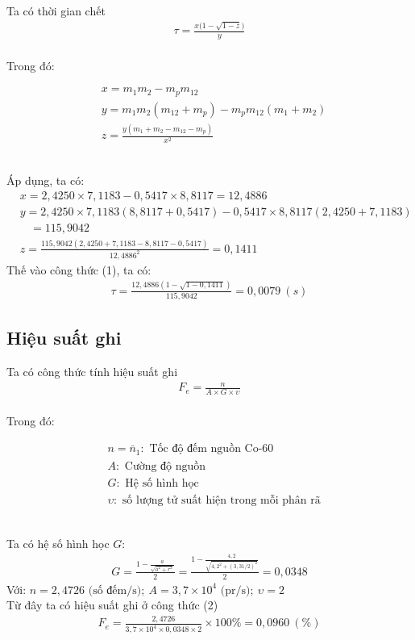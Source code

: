 \documentclass{article}
\begin{document}
Ta có thời gian chết
\begin{align}
	\tau = \frac{x\Big(1- \sqrt{1-z}\Big)}{y}
\end{align}
\\
Trong đó:
\begin{fleqn}[\parindent]
\begin{equation*}
\begin{split}
& x = m_1m_2-m_pm_{12}  \\
& y = m_1m_2(m_{12}+m_p)-m_pm_{12}(m_1+m_2) \\
& z = \frac{y(m_1+m_2-m_{12}-m_p)}{x^2} 
\end{split}
\end{equation*}
\end{fleqn}
\\
Áp dụng, ta có:
\begin{align*}
& x = 2,4250\times 7,1183 - 0,5417\times 8,8117 = 12,4886  \\
& y = 2,4250\times 7,1183(8,8117 + 0,5417)-0,5417\times 8,8117(2,4250 + 7,1183) \\
& \ \text{   }= 115,9042 \\
& z = \frac{115,9042(2,4250+7,1183-8,8117-0,5417)}{{12,4886}^2} = 0,1411 
\end{align*}
Thế vào công thức (1), ta có:
\begin{align*}
	\tau = \frac{12,4886(1-\sqrt{1-0,1411})}{115,9042} = 0,0079 \ (s)
\end{align*}

\subsection{Hiệu suất ghi}

Ta có công thức tính hiệu suất ghi
\begin{align}
	F_e = \frac{n}{A\times G \times \upsilon}
\end{align}
\\
Trong đó:
\begin{fleqn}[\parindent]
\begin{equation*}
\begin{split}
& n = \bar{n}_1: \text{ Tốc độ đếm nguồn Co-60}  \\
& A: \text{ Cường độ nguồn} \\
& G: \text{ Hệ số hình học} \\
& \upsilon : \text{ số lượng tử suất hiện trong mỗi phân rã} 
\end{split}
\end{equation*}
\end{fleqn}
\\
Ta có hệ số hình học $G$:
\begin{align*}
	G = \frac{1 - \frac{a}{\sqrt{a^2 + r^2}}}{2} = \frac{1 - \frac{4,2}{\sqrt{{4,2}^2 + (3,31/2)^2}}}{2} = 0,0348
\end{align*}
Với: $n=2,4726 \text{ (số đếm/s)};\ A = 3,7\times 10^4 \text{ (pr/s)};\ \upsilon = 2$
\\
Từ đây ta có hiệu suất ghi ở công thức (2)
\begin{align*}
	F_e = \frac{2,4726}{3,7\times 10^4 \times 0,0348 \times 2} \times 100\% = 0,0960 \ (\%)
\end{align*}

\newpage
\clearpage\thispagestyle{empty}\addtocounter{page}{-1} 
\clearpage
\mbox{}
\newpage
\end{document}
